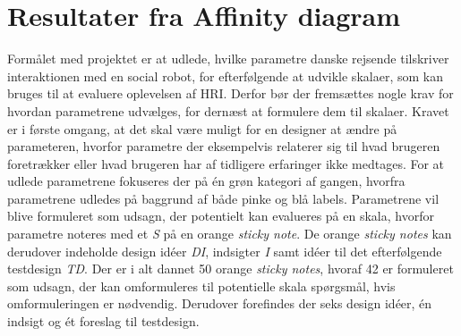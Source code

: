 \section{Resultater fra Affinity diagram}
\label{ParametreDatabehandlingAffinityDiagram}
%
%
Formålet med projektet er at udlede, hvilke parametre danske rejsende tilskriver interaktionen med en social robot, for efterfølgende at udvikle skalaer, som kan bruges til at evaluere oplevelsen af HRI. Derfor bør der fremsættes nogle krav for hvordan parametrene udvælges, for dernæst at formulere dem til skalaer. Kravet er i første omgang, at det skal være muligt for en designer at ændre på parameteren, hvorfor parametre der eksempelvis relaterer sig til hvad brugeren foretrækker eller hvad brugeren har af tidligere erfaringer ikke medtages. \blankline
%
For at udlede parametrene fokuseres der på én grøn kategori af gangen, hvorfra parametrene udledes på baggrund af både pinke og blå labels. Parametrene vil blive formuleret som udsagn, der potentielt kan evalueres på en skala, hvorfor parametre noteres med et \textit{S} på en orange \textit{sticky note}. De orange \textit{sticky notes} kan derudover indeholde design idéer \textit{DI}, indsigter \textit{I} samt idéer til det efterfølgende testdesign \textit{TD}. Der er i alt dannet 50 orange \textit{sticky notes}, hvoraf 42 er formuleret som udsagn, der kan omformuleres til potentielle skala spørgsmål, hvis omformuleringen er nødvendig. Derudover forefindes der seks design idéer, én indsigt og ét foreslag til testdesign.
